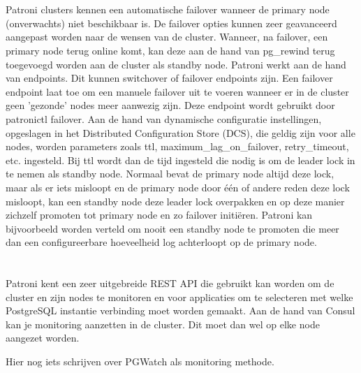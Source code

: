 

\section{}
\label{sec:Failover}

Patroni clusters kennen een automatische failover wanneer de primary node (onverwachts) niet beschikbaar is. De failover opties kunnen zeer geavanceerd aangepast worden naar de wensen van de cluster. Wanneer, na failover, een primary node terug online komt, kan deze aan de hand van pg\_rewind terug toegevoegd worden aan de cluster als standby node. Patroni werkt aan de hand van endpoints. Dit kunnen switchover of failover endpoints zijn. Een failover endpoint laat toe om een manuele failover uit te voeren wanneer er in de cluster geen 'gezonde' nodes meer aanwezig zijn. Deze endpoint wordt gebruikt door patronictl failover.
Aan de hand van dynamische configuratie instellingen, opgeslagen in het Distributed Configuration Store (DCS), die geldig zijn voor alle nodes, worden parameters zoals ttl, maximum\_lag\_on\_failover, retry\_timeout, etc. ingesteld. Bij ttl wordt dan de tijd ingesteld die nodig is om de leader lock in te nemen als standby node. Normaal bevat de primary node altijd deze lock, maar als er iets misloopt en de primary node door één of andere reden deze lock misloopt, kan een standby node deze leader lock overpakken en op deze manier zichzelf promoten tot primary node en zo failover initiëren. Patroni kan bijvoorbeeld worden verteld om nooit een standby node te promoten die meer dan een configureerbare hoeveelheid log achterloopt op de primary node.



\section{}
\label{sec:Monitoring}

Patroni kent een zeer uitgebreide REST API die gebruikt kan worden om de cluster en zijn nodes te monitoren en voor applicaties om te selecteren met welke PostgreSQL instantie verbinding moet worden gemaakt. Aan de hand van Consul kan je monitoring aanzetten in de cluster. Dit moet dan wel op elke node aangezet worden.

Hier nog iets schrijven over PGWatch als monitoring methode.




